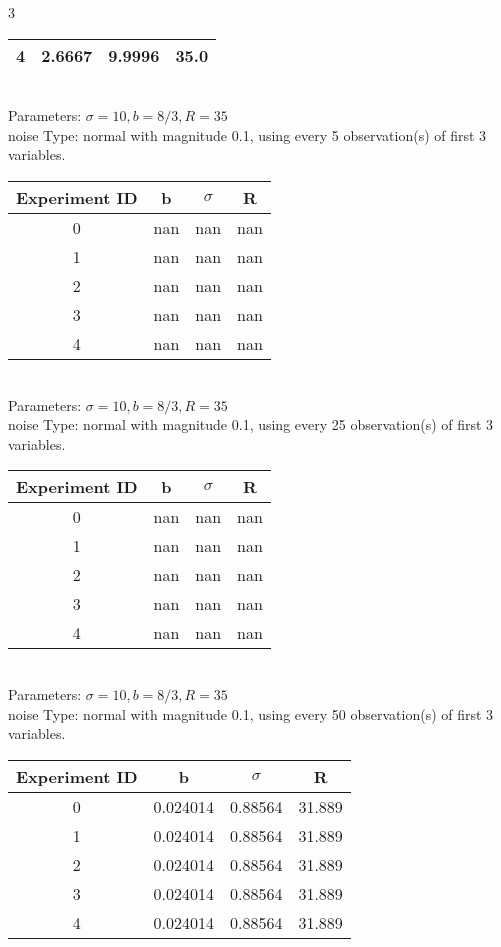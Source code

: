 \begin{multicols}{3}
\begin{tabular}{cccc}
 4 & 2.6667 & 9.9996 & 35.0\\ \hline 
 \end{tabular}\\
Parameters: $\sigma=10, b=8/3, R=35$\\
noise Type: normal with magnitude 0.1, using every 5 observation(s) of first 3 variables.\\
\begin{tabular}{cccc}
\hline Experiment ID & b & $\sigma$ & R \\ \hline 
0 & nan & nan & nan\\ \hline 
 1 & nan & nan & nan\\ \hline 
 2 & nan & nan & nan\\ \hline 
 3 & nan & nan & nan\\ \hline 
 4 & nan & nan & nan\\ \hline 
 \end{tabular}\\
Parameters: $\sigma=10, b=8/3, R=35$\\
noise Type: normal with magnitude 0.1, using every 25 observation(s) of first 3 variables.\\
\begin{tabular}{cccc}
\hline Experiment ID & b & $\sigma$ & R \\ \hline 
0 & nan & nan & nan\\ \hline 
 1 & nan & nan & nan\\ \hline 
 2 & nan & nan & nan\\ \hline 
 3 & nan & nan & nan\\ \hline 
 4 & nan & nan & nan\\ \hline 
 \end{tabular}\\
Parameters: $\sigma=10, b=8/3, R=35$\\
noise Type: normal with magnitude 0.1, using every 50 observation(s) of first 3 variables.\\
\begin{tabular}{cccc}
\hline Experiment ID & b & $\sigma$ & R \\ \hline 
0 & 0.024014 & 0.88564 & 31.889\\ \hline 
 1 & 0.024014 & 0.88564 & 31.889\\ \hline 
 2 & 0.024014 & 0.88564 & 31.889\\ \hline 
 3 & 0.024014 & 0.88564 & 31.889\\ \hline 
 4 & 0.024014 & 0.88564 & 31.889\\ \hline 
 \end{tabular}\\

\end{multicols}
